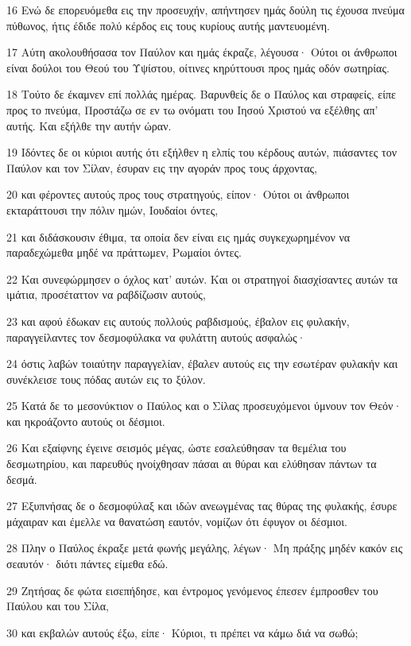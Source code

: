 \par 16 Ενώ δε επορευόμεθα εις την προσευχήν, απήντησεν ημάς δούλη τις έχουσα πνεύμα πύθωνος, ήτις έδιδε πολύ κέρδος εις τους κυρίους αυτής μαντευομένη.
\par 17 Αύτη ακολουθήσασα τον Παύλον και ημάς έκραζε, λέγουσα· Ούτοι οι άνθρωποι είναι δούλοι του Θεού του Υψίστου, οίτινες κηρύττουσι προς ημάς οδόν σωτηρίας.
\par 18 Τούτο δε έκαμνεν επί πολλάς ημέρας. Βαρυνθείς δε ο Παύλος και στραφείς, είπε προς το πνεύμα, Προστάζω σε εν τω ονόματι του Ιησού Χριστού να εξέλθης απ' αυτής. Και εξήλθε την αυτήν ώραν.
\par 19 Ιδόντες δε οι κύριοι αυτής ότι εξήλθεν η ελπίς του κέρδους αυτών, πιάσαντες τον Παύλον και τον Σίλαν, έσυραν εις την αγοράν προς τους άρχοντας,
\par 20 και φέροντες αυτούς προς τους στρατηγούς, είπον· Ούτοι οι άνθρωποι εκταράττουσι την πόλιν ημών, Ιουδαίοι όντες,
\par 21 και διδάσκουσιν έθιμα, τα οποία δεν είναι εις ημάς συγκεχωρημένον να παραδεχώμεθα μηδέ να πράττωμεν, Ρωμαίοι όντες.
\par 22 Και συνεφώρμησεν ο όχλος κατ' αυτών. Και οι στρατηγοί διασχίσαντες αυτών τα ιμάτια, προσέταττον να ραβδίζωσιν αυτούς,
\par 23 και αφού έδωκαν εις αυτούς πολλούς ραβδισμούς, έβαλον εις φυλακήν, παραγγείλαντες τον δεσμοφύλακα να φυλάττη αυτούς ασφαλώς·
\par 24 όστις λαβών τοιαύτην παραγγελίαν, έβαλεν αυτούς εις την εσωτέραν φυλακήν και συνέκλεισε τους πόδας αυτών εις το ξύλον.
\par 25 Κατά δε το μεσονύκτιον ο Παύλος και ο Σίλας προσευχόμενοι ύμνουν τον Θεόν· και ηκροάζοντο αυτούς οι δέσμιοι.
\par 26 Και εξαίφνης έγεινε σεισμός μέγας, ώστε εσαλεύθησαν τα θεμέλια του δεσμωτηρίου, και παρευθύς ηνοίχθησαν πάσαι αι θύραι και ελύθησαν πάντων τα δεσμά.
\par 27 Εξυπνήσας δε ο δεσμοφύλαξ και ιδών ανεωγμένας τας θύρας της φυλακής, έσυρε μάχαιραν και έμελλε να θανατώση εαυτόν, νομίζων ότι έφυγον οι δέσμιοι.
\par 28 Πλην ο Παύλος έκραξε μετά φωνής μεγάλης, λέγων· Μη πράξης μηδέν κακόν εις σεαυτόν· διότι πάντες είμεθα εδώ.
\par 29 Ζητήσας δε φώτα εισεπήδησε, και έντρομος γενόμενος έπεσεν έμπροσθεν του Παύλου και του Σίλα,
\par 30 και εκβαλών αυτούς έξω, είπε· Κύριοι, τι πρέπει να κάμω διά να σωθώ;
